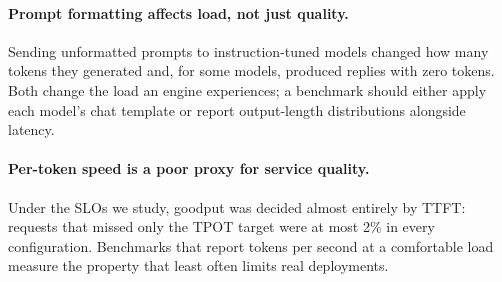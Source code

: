 \paragraph{Prompt formatting affects load, not just quality.}
Sending unformatted prompts to instruction-tuned models changed how many tokens they generated
and, for some models, produced replies with zero tokens. Both change the load an engine
experiences; a benchmark should either apply each model's chat template or report output-length
distributions alongside latency.

\paragraph{Per-token speed is a poor proxy for service quality.}
Under the SLOs we study, goodput was decided almost entirely by TTFT: requests that missed only
the TPOT target were at most 2\% in every configuration. Benchmarks that report tokens per second
at a comfortable load measure the property that least often limits real deployments.
